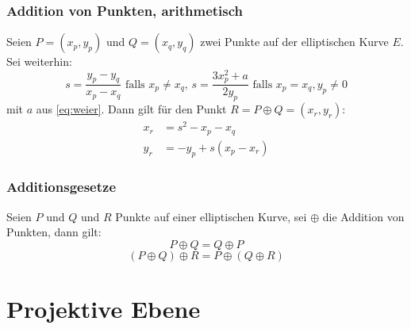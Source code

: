 \documentclass{beamer}
\begin{document}
\begin{frame}
  \frametitle{Addition von Punkten, arithmetisch}
  \begin{theorem}[Additionsformel]
    Seien $P = (x_p, y_p)$ und $Q=(x_q, y_q)$ zwei Punkte auf der elliptischen
    Kurve $E$. Sei weiterhin:
    \begin{equation*}
      s = \frac{y_p - y_q}{x_p - x_q} \text{ falls } x_p \ne x_q \text{, }
      s = \frac{3x_p^2 + a}{2y_p} \text{ falls } x_p = x_q, y_p \ne 0
    \end{equation*}
    mit $a$ aus \eqref{eq:weier}.
    Dann gilt für den Punkt $R = P \oplus Q = (x_r, y_r)$:
    \begin{equation}
      \begin{split}  \label{ec:add}
        x_r & = s^2 - x_p - x_q \\
        y_r & = -y_p + s(x_p - x_r)
      \end{split}
    \end{equation}
  \end{theorem}
\end{frame}

\begin{frame}
  \frametitle{Additionsgesetze}
  Seien $P$ und $Q$ und $R$ Punkte auf einer elliptischen Kurve, sei $\oplus$
  die Addition von Punkten, dann gilt:
  \begin{equation}
    P \oplus Q = Q \oplus P
  \end{equation}
  \begin{equation}
    (P \oplus Q) \oplus R = P \oplus (Q \oplus R)
  \end{equation}
\end{frame}


\section{Projektive Ebene}
\end{document}

